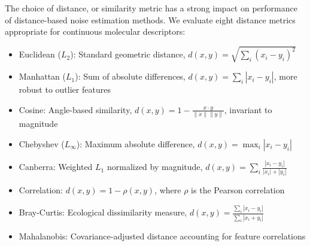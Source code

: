 %

The choice of distance, or similarity metric has a strong impact on performance of distance-based noise estimation methods. We evaluate eight distance metrics appropriate for continuous molecular descriptors:

\begin{itemize}
    \item Euclidean ($L_2$): Standard geometric distance, $d(x, y) = \sqrt{\sum_i (x_i - y_i)^2}$
    \item Manhattan ($L_1$): Sum of absolute differences, $d(x, y) = \sum_i |x_i - y_i|$, more robust to outlier features
    \item Cosine: Angle-based similarity, $d(x, y) = 1 - \frac{x \cdot y}{\|x\| \|y\|}$, invariant to magnitude
    \item Chebyshev ($L_\infty$): Maximum absolute difference, $d(x, y) = \max_i |x_i - y_i|$
    \item Canberra: Weighted $L_1$ normalized by magnitude, $d(x, y) = \sum_i \frac{|x_i - y_i|}{|x_i| + |y_i|}$
    \item Correlation: $d(x, y) = 1 - \rho(x, y)$, where $\rho$ is the Pearson correlation
    \item Bray-Curtis: Ecological dissimilarity measure, $d(x, y) = \frac{\sum_i |x_i - y_i|}{\sum_i |x_i + y_i|}$
    \item Mahalanobis: Covariance-adjusted distance accounting for feature correlations
\end{itemize}

